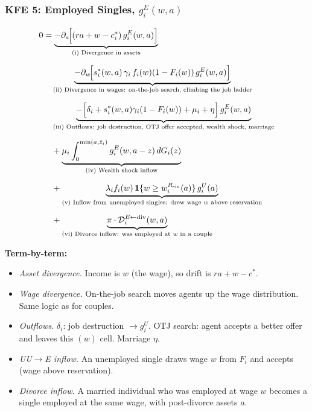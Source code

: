 \documentclass{article}
\begin{document}
\subsubsection*{KFE 5: Employed Singles, $g_i^E(w, a)$}

\begin{align}
    0 &= \underbrace{-\partial_a\!\Big[(ra + w - c_i^*)\, g_i^E(w,a)\Big]}_{\text{(i) Divergence in assets}} \notag\\[6pt]
    &\quad \underbrace{-\partial_w\!\Big[s_i^*(w,a)\,\gamma_i\, f_i(w)(1-F_i(w))\, g_i^E(w,a)\Big]}_{\text{(ii) Divergence in wages: on-the-job search, climbing the job ladder}} \notag\\[6pt]
    &\quad \underbrace{- \Big[\delta_i + s_i^*(w,a)\gamma_i(1-F_i(w)) + \mu_i + \eta\Big]\, g_i^E(w,a)}_{\text{(iii) Outflows: job destruction, OTJ offer accepted, wealth shock, marriage}} \notag\\[6pt]
    &\quad + \underbrace{\mu_i \int_0^{\min(a,\bar{z}_i)} g_i^E(w, a-z)\, dG_i(z)}_{\text{(iv) Wealth shock inflow}} \notag\\[6pt]
    &\quad + \underbrace{\lambda_i f_i(w)\,\mathbf{1}\{w \geq w_i^{R_{\sin}}(a)\}\, g_i^U(a)}_{\text{(v) Inflow from unemployed singles: drew wage $w$ above reservation}} \notag\\[6pt]
    &\quad + \underbrace{\pi\cdot\mathcal{D}_i^{E\leftarrow\text{div}}(w,a)}_{\text{(vi) Divorce inflow: was employed at $w$ in a couple}}
    \label{eq:KFE_Esin}
\end{align}

\textbf{Term-by-term:}
\begin{itemize}
    \item[(i)] \textit{Asset divergence.} Income is $w$ (the wage), so drift is $ra + w - c^*$.
    \item[(ii)] \textit{Wage divergence.} On-the-job search moves agents up the wage distribution. Same logic as for couples.
    \item[(iii)] \textit{Outflows.} $\delta_i$: job destruction $\to g_i^U$. OTJ search: agent accepts a better offer and leaves this $(w)$ cell. Marriage $\eta$.
    \item[(v)] \textit{UU$\to$E inflow.} An unemployed single draws wage $w$ from $F_i$ and accepts (wage above reservation).
    \item[(vi)] \textit{Divorce inflow.} A married individual who was employed at wage $w$ becomes a single employed at the same wage, with post-divorce assets $a$.
\end{itemize}
\end{document}
